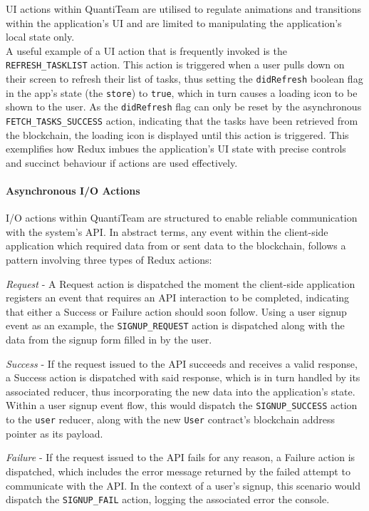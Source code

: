 \documentclass[12pt]{report}
\let\oldparagraph\paragraph
\renewcommand{\paragraph}[1]{\oldparagraph{#1}\mbox{}}
\begin{document}
UI actions within QuantiTeam are utilised to regulate animations and
transitions within the application's UI and are limited to manipulating
the application's local state only.\\
A useful example of a UI action that is frequently invoked is the
\texttt{REFRESH\_TASKLIST} action. This action is triggered when a user
pulls down on their screen to refresh their list of tasks, thus setting
the \texttt{didRefresh} boolean flag in the app's state (the
\texttt{store}) to \texttt{true}, which in turn causes a loading icon to
be shown to the user. As the \texttt{didRefresh} flag can only be reset
by the asynchronous \texttt{FETCH\_TASKS\_SUCCESS} action, indicating
that the tasks have been retrieved from the blockchain, the loading icon
is displayed until this action is triggered. This exemplifies how Redux
imbues the application's UI state with precise controls and succinct
behaviour if actions are used effectively.

\paragraph{Asynchronous I/O Actions}\label{asynchronous-io-actions}

I/O actions within QuantiTeam are structured to enable reliable
communication with the system's API. In abstract terms, any event within
the client-side application which required data from or sent data to the
blockchain, follows a pattern involving three types of Redux
actions\cite{1redux}:

\emph{Request} - A Request action is dispatched the moment the
client-side application registers an event that requires an API
interaction to be completed, indicating that either a Success or Failure
action should soon follow. Using a user signup event as an example, the
\texttt{SIGNUP\_REQUEST} action is dispatched along with the data from
the signup form filled in by the user.

\emph{Success} - If the request issued to the API succeeds and receives
a valid response, a Success action is dispatched with said response,
which is in turn handled by its associated reducer, thus incorporating
the new data into the application's state. Within a user signup event
flow, this would dispatch the \texttt{SIGNUP\_SUCCESS} action to the
\texttt{user} reducer, along with the new \texttt{User} contract's
blockchain address pointer as its payload.

\emph{Failure} - If the request issued to the API fails for any reason,
a Failure action is dispatched, which includes the error message
returned by the failed attempt to communicate with the API. In the
context of a user's signup, this scenario would dispatch the
\texttt{SIGNUP\_FAIL} action, logging the associated error the console.
\end{document}
